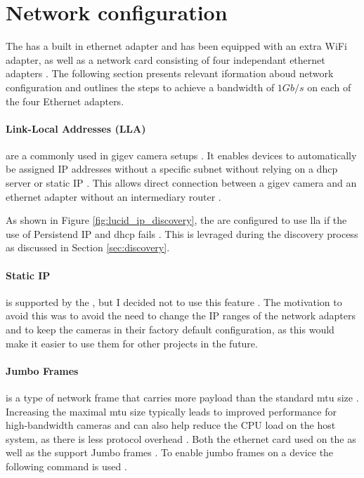 \section{Network configuration}
The \jx has a built in ethernet adapter and has been equipped with an extra WiFi adapter, as well as a network card consisting of four independant ethernet adapters \cite[Section 6.5]{martensPortableSensorRig2022}.
The following section presents relevant iformation aboud network configuration and outlines the steps to achieve a bandwidth of $1Gb/s$ on each of the four Ethernet adapters.

\paragraph{Link-Local Addresses (LLA)} are a commonly used in \gls{gigev} camera setups \cite{teledyneSettingIPAddress01} \cite{lucidvisionlabsArenaSoftwareDevelopment2020}.
It enables devices to automatically be assigned IP addresses without a specific subnet without relying on a \gls{dhcp} server or static IP \cite{annieahujaweb2020LinkLocalAddress2022}.
This allows direct connection between a \gls{gigev} camera and an ethernet adapter without an intermediary router \cite{annieahujaweb2020LinkLocalAddress2022}.

As shown in Figure \ref{fig:lucid_ip_discovery}, the \cams are configured to use \gls{lla} if the use of Persistend IP and \gls{dhcp} fails \cite{lucidvisionlabsArenaSoftwareDevelopment2020}.
This is levraged during the discovery process as discussed in Section \ref{sec:discovery}.

\paragraph{Static IP} is supported by the \cams, but I decided not to use this feature \cite{lucidvisionlabsArenaSoftwareDevelopment2020}.
The motivation to avoid this was to avoid the need to change the IP ranges of the network adapters and to keep the cameras in their factory default configuration, as this would make it easier to use them for other projects in the future.

\paragraph{Jumbo Frames} is a type of network frame that carries more payload than the standard \gls{mtu} size \cite{ieeeIEEEStandardsInterpretation2002} \cite{lucidvisionlabsJumboFramesLUCID2020}.
Increasing the maximal \gls{mtu} size typically leads to improved performance for high-bandwidth cameras and can also help reduce the CPU load on the host system, as there is less protocol overhead \cite{lucidvisionlabsJumboFramesLUCID2020} \cite{lukeThingsYouShould2018}.
Both the ethernet card used on the \jx as well as the \cams support Jumbo frames \cite{IntelI350am4Chip} \cite{lucidvisionlabsTritonMPPolarized2020}.
To enable jumbo frames on a device the following command is used .

